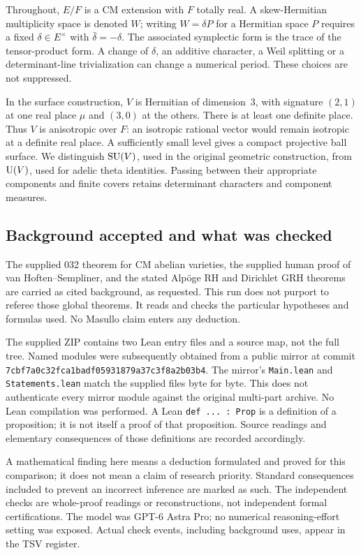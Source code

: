 \documentclass[11pt]{article}
\theoremstyle{definition}\newtheorem{definition}[theorem]{Definition}\newtheorem{remark}[theorem]{Remark}
\begin{document}
Throughout, $E/F$ is a CM extension with $F$ totally real. A skew-Hermitian multiplicity space is denoted $W$; writing $W=\delta P$ for a Hermitian space $P$ requires a fixed $\delta\in E^\times$ with $\bar\delta=-\delta$. The associated symplectic form is the trace of the tensor-product form. A change of $\delta$, an additive character, a Weil splitting or a determinant-line trivialization can change a numerical period. These choices are not suppressed.

In the surface construction, $V$ is Hermitian of dimension~3, with signature $(2,1)$ at one real place $\mu$ and $(3,0)$ at the others. There is at least one definite place. Thus $V$ is anisotropic over $F$: an isotropic rational vector would remain isotropic at a definite real place. A sufficiently small level gives a compact projective ball surface. We distinguish $\operatorname{SU}(V)$, used in the original geometric construction, from $\operatorname{U}(V)$, used for adelic theta identities. Passing between their appropriate components and finite covers retains determinant characters and component measures.

\subsection{Background accepted and what was checked}
The supplied 032 theorem for CM abelian varieties, the supplied human proof of van Hoften--Sempliner, and the stated Alp\"oge RH and Dirichlet GRH theorems are carried as cited background, as requested. This run does not purport to referee those global theorems. It reads and checks the particular hypotheses and formulas used. No Masullo claim enters any deduction.

The supplied ZIP contains two Lean entry files and a source map, not the full tree. Named modules were subsequently obtained from a public mirror at commit
\texttt{7cbf7a0c32fca1badf05931879a37c3f8a2b03b4}.
The mirror's \texttt{Main.lean} and \texttt{Statements.lean} match the supplied files byte for byte. This does not authenticate every mirror module against the original multi-part archive. No Lean compilation was performed. A Lean \texttt{def ... : Prop} is a definition of a proposition; it is not itself a proof of that proposition. Source readings and elementary consequences of those definitions are recorded accordingly.

A mathematical finding here means a deduction formulated and proved for this comparison; it does not mean a claim of research priority. Standard consequences included to prevent an incorrect inference are marked as such. The independent checks are whole-proof readings or reconstructions, not independent formal certifications. The model was GPT-6 Astra Pro; no numerical reasoning-effort setting was exposed. Actual check events, including background uses, appear in the TSV register.
\end{document}
